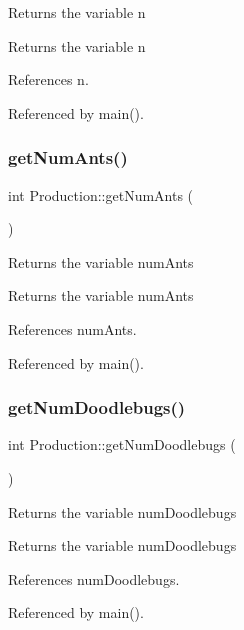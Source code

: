 Returns the variable n \begin{DoxyReturn}{Returns}
the variable n 
\end{DoxyReturn}


References n.



Referenced by main().

\mbox{\label{classProduction_a418b8ed0c5e41e1539c4859cf833ba47}} 
\subsubsection{get\+Num\+Ants()}
{\footnotesize\ttfamily int Production\+::get\+Num\+Ants (\begin{DoxyParamCaption}{ }\end{DoxyParamCaption})}

Returns the variable num\+Ants \begin{DoxyReturn}{Returns}
the variable num\+Ants 
\end{DoxyReturn}


References num\+Ants.



Referenced by main().

\mbox{\label{classProduction_a0c6949850b1ec88f5dc71751b6abc8ac}} 
\subsubsection{get\+Num\+Doodlebugs()}
{\footnotesize\ttfamily int Production\+::get\+Num\+Doodlebugs (\begin{DoxyParamCaption}{ }\end{DoxyParamCaption})}

Returns the variable num\+Doodlebugs \begin{DoxyReturn}{Returns}
the variable num\+Doodlebugs 
\end{DoxyReturn}


References num\+Doodlebugs.



Referenced by main().

\mbox{\label{classProduction_a5d54aec3db3b6bb0b7f2629759d10244}} 
